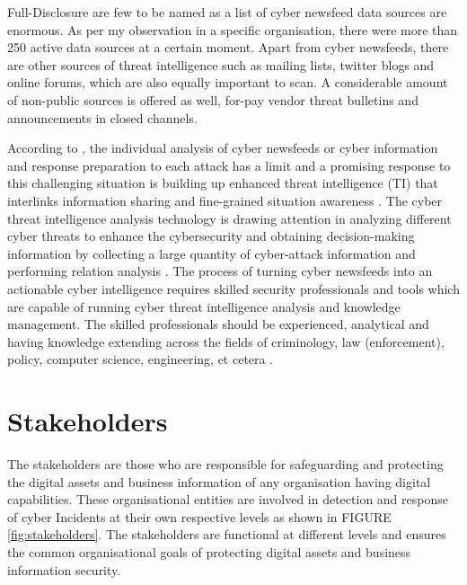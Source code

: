 Full-Disclosure are few to be named 
as a list of cyber newsfeed data sources 
are enormous. 
As per my observation in a specific organisation, 
there were more than 250 active data sources at a certain moment. 
Apart from cyber newsfeeds, 
there are other sources of 
threat intelligence such as  mailing lists, 
twitter blogs 
and online forums, 
which are also equally important to scan. 
A considerable amount of non-public sources 
is offered as well, 
for-pay vendor threat bulletins 
and announcements in closed channels.

According to \cite{leszczyna2019threat}, the individual analysis 
of cyber newsfeeds 
or cyber information 
and response preparation to each attack 
has a limit and 
a promising response to this challenging situation 
is building up enhanced threat intelligence (TI) 
that interlinks information sharing 
and fine-grained situation awareness 
\citep{leszczyna2019threat}. 
The cyber threat intelligence analysis technology 
is drawing attention in analyzing different cyber threats 
to enhance the cybersecurity 
and obtaining decision-making information 
by collecting a large quantity of cyber-attack information 
and performing relation analysis 
\citep{chung2016internet}. 
The process of turning cyber newsfeeds  
into an actionable cyber intelligence
requires skilled security professionals 
and tools which are capable of 
running cyber threat intelligence analysis and knowledge management. 
The skilled professionals 
should be experienced, analytical 
and having knowledge extending across the fields 
of criminology, law (enforcement), 
policy, computer science, engineering, et cetera 
\citep{martini2014building}.

\section{Stakeholders}

The stakeholders
\citep{farnham2013tools} 
are those who are responsible for safeguarding 
and protecting the digital assets 
and business information 
of any organisation having digital capabilities. 
These organisational entities 
are involved in detection and response 
of cyber Incidents 
at their own respective levels 
as shown in FIGURE \ref{fig:stakeholders}. 
The stakeholders 
are functional at different levels 
and ensures the common organisational goals
of protecting digital assets and business information security.

